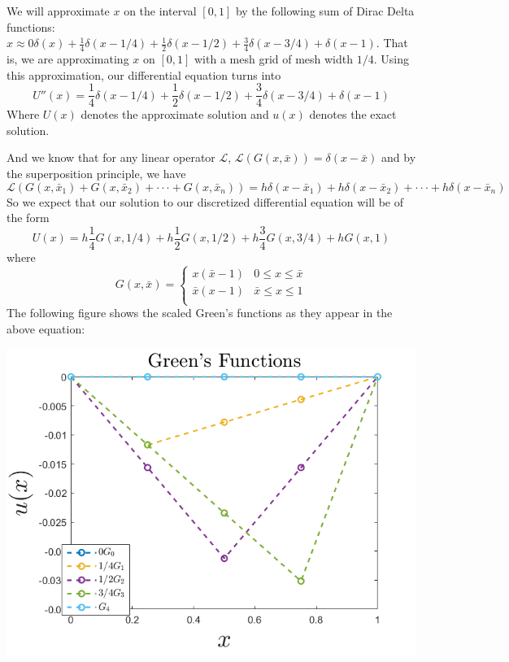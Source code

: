 \documentclass{article}
\begin{document}
We will approximate $x$ on the interval $[0,1]$ by the following sum of Dirac Delta functions: $x \approx 0\delta(x) + \frac{1}{4}\delta(x - 1/4) + \frac{1}{2}\delta(x - 1/2) + \frac{3}{4}\delta(x - 3/4) + \delta(x - 1)$. That is, we are approximating $x$ on $[0,1]$ with a mesh grid of mesh width $1/4$. Using this approximation, our differential equation turns into
\[U''(x) = \frac{1}{4}\delta(x - 1/4) + \frac{1}{2}\delta(x - 1/2) + \frac{3}{4}\delta(x - 3/4) + \delta(x - 1)\]
Where $U(x)$ denotes the approximate solution and $u(x)$ denotes the exact solution.

And we know that for any linear operator $\mathcal{L}$, $\mathcal{L}(G(x,\bar{x})) = \delta(x - \bar{x})$ and by the superposition principle, we have 
\[\mathcal{L}(G(x, \bar{x}_1) + G(x, \bar{x}_2) + \cdot \cdot\cdot + G(x, \bar{x}_n)) = h\delta(x - \bar{x}_1) + h\delta(x - \bar{x}_2) + \cdot\cdot\cdot + h\delta(x - \bar{x}_n)\]
So we expect that our solution to our discretized differential equation will be of the form
\[U(x) = h\frac{1}{4}G(x, 1/4) + h\frac{1}{2}G(x,1/2) + h\frac{3}{4}G(x,3/4) + hG(x, 1)\] 
where 
\[G(x, \bar{x}) = \begin{cases}
    x(\bar{x} - 1) & 0 \leq x \leq \bar{x}\\
    \bar{x}(x - 1) & \bar{x} \leq x \leq 1\\
\end{cases}\]
The following figure shows the scaled Green's functions as they appear in the above equation:

\begin{center}
    \includegraphics[scale = 0.5]{greensfunctionsfixed.png}
\end{center}
\end{document}
